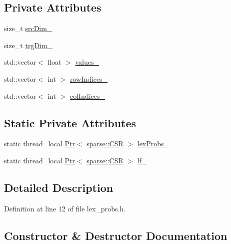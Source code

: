 \subsection*{Private Attributes}
\begin{DoxyCompactItemize}
\item 
size\+\_\+t \hyperlink{classmarian_1_1LexProbs_a066f91b5a18aa4e703d36b2e5583a1d5}{src\+Dim\+\_\+}
\item 
size\+\_\+t \hyperlink{classmarian_1_1LexProbs_aca81dfd4fe0b8a08e499cfeab3115950}{trg\+Dim\+\_\+}
\item 
std\+::vector$<$ float $>$ \hyperlink{classmarian_1_1LexProbs_a12c2b523b16a3239d99fd69a6a463927}{values\+\_\+}
\item 
std\+::vector$<$ int $>$ \hyperlink{classmarian_1_1LexProbs_af0877c33d19bcec0d40e3cc99946d93b}{row\+Indices\+\_\+}
\item 
std\+::vector$<$ int $>$ \hyperlink{classmarian_1_1LexProbs_af46061a0c4104dce0c8da7d91f014f44}{col\+Indices\+\_\+}
\end{DoxyCompactItemize}
\subsection*{Static Private Attributes}
\begin{DoxyCompactItemize}
\item 
static thread\+\_\+local \hyperlink{namespacemarian_ad1a373be43a00ef9ce35666145137b08}{Ptr}$<$ \hyperlink{classmarian_1_1sparse_1_1CSR}{sparse\+::\+C\+SR} $>$ \hyperlink{classmarian_1_1LexProbs_a58752d3501db781924b464b19d0d3af2}{lex\+Probs\+\_\+}
\item 
static thread\+\_\+local \hyperlink{namespacemarian_ad1a373be43a00ef9ce35666145137b08}{Ptr}$<$ \hyperlink{classmarian_1_1sparse_1_1CSR}{sparse\+::\+C\+SR} $>$ \hyperlink{classmarian_1_1LexProbs_a65bfae71dcdadf29398ab31ab855065c}{lf\+\_\+}
\end{DoxyCompactItemize}


\subsection{Detailed Description}


Definition at line 12 of file lex\+\_\+probs.\+h.



\subsection{Constructor \& Destructor Documentation}
